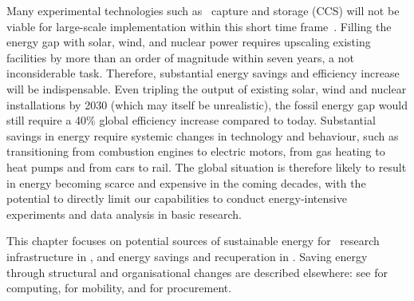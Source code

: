 \documentclass[../SustainableHEP.tex]{subfiles}
\begin{document}

Many experimental technologies such as \CdO\ capture and storage (CCS) will not be viable for large-scale implementation within this short time frame~\cite{IPCCMitigationReport}. Filling the energy gap with solar, wind, and nuclear power requires upscaling existing facilities by more than an order of magnitude within seven years, a not inconsiderable task. Therefore, substantial energy savings and efficiency increase will be indispensable. Even tripling the output of existing solar, wind and nuclear installations by 2030 (which may itself be unrealistic), the fossil energy gap would still require a 40\% global efficiency increase compared to today. Substantial savings in energy require systemic changes in technology and behaviour, such as transitioning from combustion engines to electric motors, from gas heating to heat pumps and from cars to rail. The global situation is therefore likely to result in energy becoming scarce and expensive in the coming decades, with the potential to directly limit our capabilities to conduct energy-intensive experiments and data analysis in basic research.

This chapter focuses on potential sources of sustainable energy for \ACR\ research infrastructure in , and energy savings and recuperation in . Saving energy through structural and organisational changes are described elsewhere: see  for computing,  for mobility, and  for procurement.


\clearpage
\end{document}
